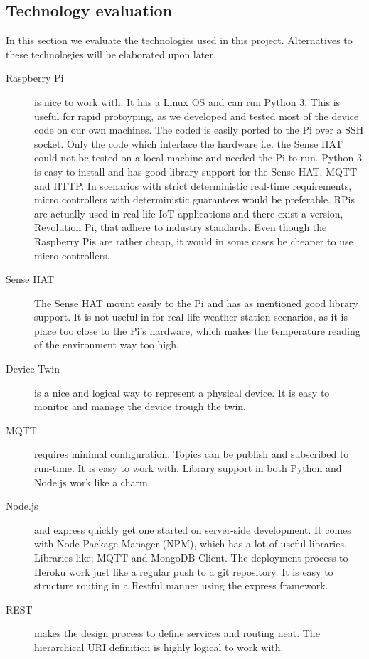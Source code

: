 \subsection*{Technology evaluation}
In this section we evaluate the technologies used in this project. Alternatives to these technologies will be elaborated upon later.
\begin{description}
    \item[Raspberry Pi] is nice to work with. It has a Linux OS and can run Python 3. This is useful for rapid protoyping, as we developed and tested most of the device code on our own machines. The coded is easily ported to the Pi over a SSH socket. Only the code which interface the hardware i.e. the Sense HAT could not be tested on a local machine and needed the Pi to run. Python 3 is easy to install and has good library support for the Sense HAT, MQTT and HTTP.  In scenarios with strict deterministic real-time requirements, micro controllers with deterministic guarantees would be preferable. RPis are actually used in real-life IoT applications and there exist a version, Revolution Pi, that adhere to industry standards. Even though the Raspberry Pis are rather cheap, it would in some cases be cheaper to use micro controllers. 
    \item[Sense HAT] The Sense HAT mount easily to the Pi and has as mentioned good library support. It is not useful in for real-life weather station scenarios, as it is place too close to the Pi's hardware, which makes the temperature reading of the environment way too high.
    \item[Device Twin] is a nice and logical way to represent a physical device. It is easy to monitor and manage the device trough the twin.  
    \item[MQTT] requires minimal configuration. Topics can be publish and subscribed to run-time. It is easy to work with. Library support in both Python and Node.js work like a charm. 
    \item[Node.js] and express quickly get one started on server-side development. It comes with Node Package Manager (NPM), which has a lot of useful libraries. Libraries like; MQTT and MongoDB Client. The deployment process to Heroku work just like a regular push to a git repository. It is easy to structure routing in a Restful manner using the express framework.
    \item[REST] makes the design process to define services and routing neat. The hierarchical URI definition is highly logical to work with.  

\end{description}
